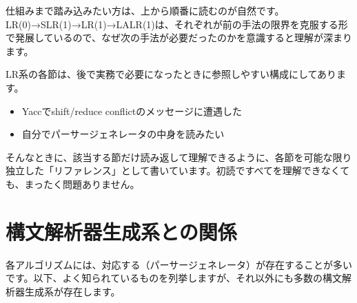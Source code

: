 仕組みまで踏み込みたい方は、上から順番に読むのが自然です。LR(0)→SLR(1)→LR(1)→LALR(1)は、それぞれが前の手法の限界を克服する形で発展しているので、なぜ次の手法が必要だったのかを意識すると理解が深まります。

LR系の各節は、後で実務で必要になったときに参照しやすい構成にしてあります。

\begin{itemize}
\item Yaccでshift/reduce conflictのメッセージに遭遇した
\item 自分でパーサージェネレータの中身を読みたい
\end{itemize}

そんなときに、該当する節だけ読み返して理解できるように、各節を可能な限り独立した「リファレンス」として書いています。初読ですべてを理解できなくても、まったく問題ありません。

\section{構文解析器生成系との関係}

各アルゴリズムには、対応する（パーサージェネレータ）が存在することが多いです。以下、よく知られているものを列挙しますが、それ以外にも多数の構文解析器生成系が存在します。

